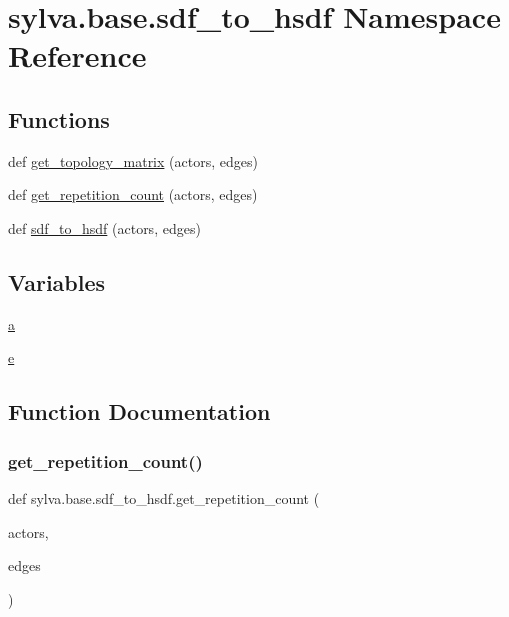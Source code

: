 \hypertarget{namespacesylva_1_1base_1_1sdf__to__hsdf}{}\section{sylva.\+base.\+sdf\+\_\+to\+\_\+hsdf Namespace Reference}
\label{namespacesylva_1_1base_1_1sdf__to__hsdf}
\subsection*{Functions}
\begin{DoxyCompactItemize}
\item 
def \hyperlink{namespacesylva_1_1base_1_1sdf__to__hsdf_a947a1ab376b5ba3021f86fba7fcb17aa}{get\+\_\+topology\+\_\+matrix} (actors, edges)
\item 
def \hyperlink{namespacesylva_1_1base_1_1sdf__to__hsdf_a9c5d04cd8f0b409b56239871067f50d5}{get\+\_\+repetition\+\_\+count} (actors, edges)
\item 
def \hyperlink{namespacesylva_1_1base_1_1sdf__to__hsdf_a41dda1a461cf7b083fbd682fc94d5e10}{sdf\+\_\+to\+\_\+hsdf} (actors, edges)
\end{DoxyCompactItemize}
\subsection*{Variables}
\begin{DoxyCompactItemize}
\item 
\hyperlink{namespacesylva_1_1base_1_1sdf__to__hsdf_a710df9adbb419e1b4040e6dd8d6dae33}{a}
\item 
\hyperlink{namespacesylva_1_1base_1_1sdf__to__hsdf_a57320ee4c07c8816e2182840df922b60}{e}
\end{DoxyCompactItemize}


\subsection{Function Documentation}
\mbox{\label{namespacesylva_1_1base_1_1sdf__to__hsdf_a9c5d04cd8f0b409b56239871067f50d5}} 
\subsubsection{\texorpdfstring{get\+\_\+repetition\+\_\+count()}{get\_repetition\_count()}}
{\footnotesize\ttfamily def sylva.\+base.\+sdf\+\_\+to\+\_\+hsdf.\+get\+\_\+repetition\+\_\+count (\begin{DoxyParamCaption}\item[{}]{actors,  }\item[{}]{edges }\end{DoxyParamCaption})}



